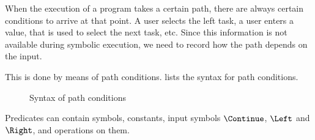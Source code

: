 When the execution of a \TOPHAT program takes a certain path, there are always certain conditions to arrive at that point.
A user selects the left task, a user enters a value, that is used to select the next task, etc.
Since this information is not available during symbolic execution, we need to record how the path depends on the input.

This is done by means of path conditions.
 lists the syntax for path conditions.

\begin{figure}
  \caption{Syntax of path conditions}
  \label{fig:syntaxpredicates}
\end{figure}

Predicates can contain symbols, constants, input symbols $\Continue$, $\Left$ and $\Right$, and operations on them.
